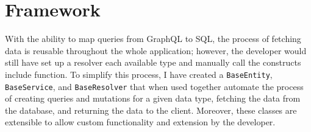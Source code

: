 \section{Framework}
With the ability to map queries from GraphQL to SQL, the process of fetching data is reusable throughout the whole application; however, the developer would still have set up a resolver each available type and manually call the constructs include function.  To simplify this process, I have created a \verb!BaseEntity!, \verb!BaseService!, and \verb!BaseResolver! that when used together automate the process of creating queries and mutations for a given data type, fetching the data from the database, and returning the data to the client.  Moreover, these classes are extensible to allow custom functionality and extension by the developer.





